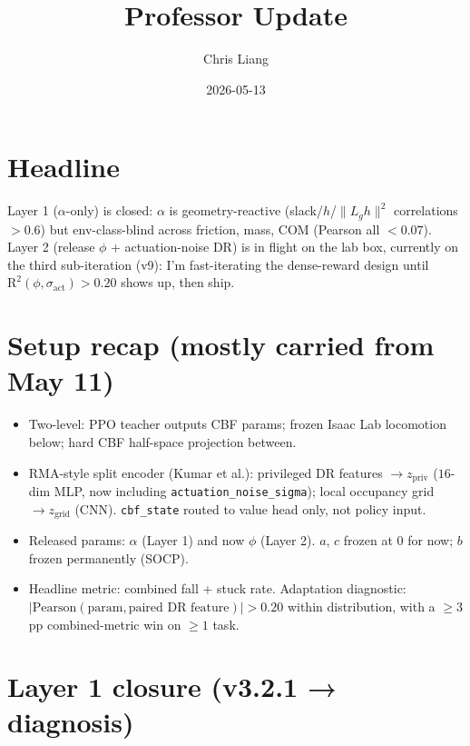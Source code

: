 \documentclass[11pt]{article}
\title{Professor Update}
\author{Chris Liang}
\date{2026-05-13}
\begin{document}
\maketitle

\section*{Headline}

Layer 1 ($\alpha$-only) is closed: $\alpha$ is geometry-reactive (slack/$h$/$\|L_g h\|^2$ correlations $> 0.6$) but env-class-blind across friction, mass, COM (Pearson all $< 0.07$). Layer 2 (release $\phi$ + actuation-noise DR) is in flight on the lab box, currently on the third sub-iteration (v9): I'm fast-iterating the dense-reward design until $\text{R}^2(\phi, \sigma_\text{act}) > 0.20$ shows up, then ship.

\section*{Setup recap (mostly carried from May 11)}

\begin{itemize}
\item Two-level: PPO teacher outputs CBF params; frozen Isaac Lab locomotion below; hard CBF half-space projection between.
\item RMA-style split encoder (Kumar et al.): privileged DR features $\to z_{\text{priv}}$ ($16$-dim MLP, now including \texttt{actuation\_noise\_sigma}); local occupancy grid $\to z_{\text{grid}}$ (CNN). \texttt{cbf\_state} routed to value head only, not policy input.
\item Released params: $\alpha$ (Layer 1) and now $\phi$ (Layer 2). $a$, $c$ frozen at $0$ for now; $b$ frozen permanently (SOCP).
\item Headline metric: combined fall + stuck rate. Adaptation diagnostic: $|\text{Pearson}(\text{param}, \text{paired DR feature})| > 0.20$ within distribution, with a $\geq 3$pp combined-metric win on $\geq 1$ task.
\end{itemize}

\section*{Layer 1 closure (v3.2.1 → diagnosis)}
\end{document}
